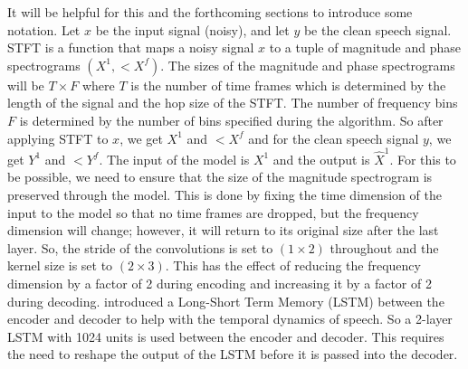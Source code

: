 \documentclass[logo,bsc,singlespacing,parskip,online]{infthesis}
\begin{document}
It will be helpful for this and the forthcoming sections to introduce some notation.
Let $x$ be the input signal (noisy), and let $y$ be the clean speech signal. 
STFT is a function that maps a noisy signal $x$ to a tuple of magnitude and phase spectrograms $(X^{1}, <X^{f})$.
The sizes of the magnitude and phase spectrograms will be $T \times F$ where $T$ is the number of time frames which is 
determined by the length of the signal and the hop size of the STFT. The number of frequency bins $F$ is determined by the 
number of bins specified during the algorithm.
So after applying STFT to $x$, we get $X^{1}$ and $<X^{f}$ and for the clean speech signal $y$, we get $Y^{1}$ and $<Y^{f}$.
The input of the model is $X^{1}$ and the output is $\hat{X}^{1}$. For this to be possible, we need to ensure that the size of the 
magnitude spectrogram is preserved through the model. This is done by fixing the time dimension of the input to the model 
so that no time frames are dropped, but the frequency dimension will change; however, it will return to its original size after the last layer.
So, the stride of the convolutions is set to $(1 \times 2)$ throughout and the kernel size is set to $(2 \times 3)$. 
This has the effect of reducing the frequency dimension by a factor of 2 during encoding and increasing it by a factor of 2 during decoding.
\citet{tan18_interspeech} introduced a Long-Short Term Memory (LSTM) between the encoder and decoder to help with 
the temporal dynamics of speech. So a 2-layer LSTM with 1024 units is used between the encoder and decoder. This 
requires the need to reshape the output of the LSTM before it is passed into the decoder.
\end{document}
